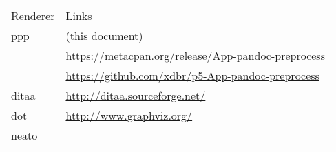 \documentclass[]{article}
\begin{document}
\begin{longtable}[c]{@{}ll@{}}
\toprule\addlinespace
\begin{minipage}[b]{0.15\columnwidth}\raggedright
Renderer
\end{minipage} & \begin{minipage}[b]{0.79\columnwidth}\raggedright
Links
\end{minipage}
\\\addlinespace
\midrule\endhead
\begin{minipage}[t]{0.15\columnwidth}\raggedright
ppp
\end{minipage} & \begin{minipage}[t]{0.79\columnwidth}\raggedright
(this document)
\end{minipage}
\\\addlinespace
\begin{minipage}[t]{0.15\columnwidth}\raggedright
\end{minipage} & \begin{minipage}[t]{0.79\columnwidth}\raggedright
\url{https://metacpan.org/release/App-pandoc-preprocess}
\end{minipage}
\\\addlinespace
\begin{minipage}[t]{0.15\columnwidth}\raggedright
\end{minipage} & \begin{minipage}[t]{0.79\columnwidth}\raggedright
\url{https://github.com/xdbr/p5-App-pandoc-preprocess}
\end{minipage}
\\\addlinespace
\begin{minipage}[t]{0.15\columnwidth}\raggedright
ditaa
\end{minipage} & \begin{minipage}[t]{0.79\columnwidth}\raggedright
\url{http://ditaa.sourceforge.net/}
\end{minipage}
\\\addlinespace
\begin{minipage}[t]{0.15\columnwidth}\raggedright
dot
\end{minipage} & \begin{minipage}[t]{0.79\columnwidth}\raggedright
\url{http://www.graphviz.org/}
\end{minipage}
\\\addlinespace
\begin{minipage}[t]{0.15\columnwidth}\raggedright
neato
\end{minipage} & \begin{minipage}[t]{0.79\columnwidth}\raggedright

\end{minipage}
\end{longtable}
\end{document}
